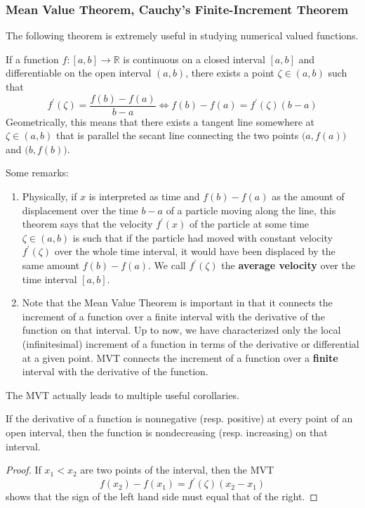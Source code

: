   \subsubsection{Mean Value Theorem, Cauchy's Finite-Increment Theorem}

  The following theorem is extremely useful in studying numerical valued functions. 

  \begin{theorem}
  If a function $f: [a,b] \longrightarrow \mathbb{R}$ is continuous on a closed interval $[a,b]$ and differentiable on the open interval $(a, b)$, there exists a point $\zeta \in (a, b)$ such that 
  \[f^\prime (\zeta) = \frac{f(b) - f(a)}{b - a} \iff f(b) - f(a) = f^\prime (\zeta) (b-a)\]
  Geometrically, this means that there exists a tangent line somewhere at $\zeta \in (a, b)$ that is parallel the secant line connecting the two points $\big(a, f(a)\big)$ and $\big( b, f(b)\big)$. 
  \end{theorem}

  Some remarks: 
  \begin{enumerate}
    \item Physically, if $x$ is interpreted as time and $f(b) - f(a)$ as the amount of displacement over the time $b-a$ of a particle moving along the line, this theorem says that the velocity $f^\prime (x)$ of the particle at some time $\zeta \in (a, b)$ is such that if the particle had moved with constant velocity $f^\prime (\zeta)$ over the whole time interval, it would have been displaced by the same amount $f(b) - f(a)$. We call $f^\prime (\zeta)$ the \textbf{average velocity} over the time interval $[a, b]$. 
    \item Note that the Mean Value Theorem is important in that it connects the increment of a function over a finite interval with the derivative of the function on that interval. Up to now, we have characterized only the local (infinitesimal) increment of a function in terms of the derivative or differential at a given point. MVT connects the increment of a function over a \textbf{finite} interval with the derivative of the function. 
  \end{enumerate}

  The MVT actually leads to multiple useful corollaries. 

  \begin{corollary}
  If the derivative of a function is nonnegative (resp. positive) at every point of an open interval, then the function is nondecreasing (resp. increasing) on that interval. 
  \end{corollary}
  \begin{proof}
  If $x_1 < x_2$ are two points of the interval, then the MVT
  \[f(x_2) - f(x_1) = f^\prime (\zeta) (x_2 - x_1)\]
  shows that the sign of the left hand side must equal that of the right. 
  \end{proof}

